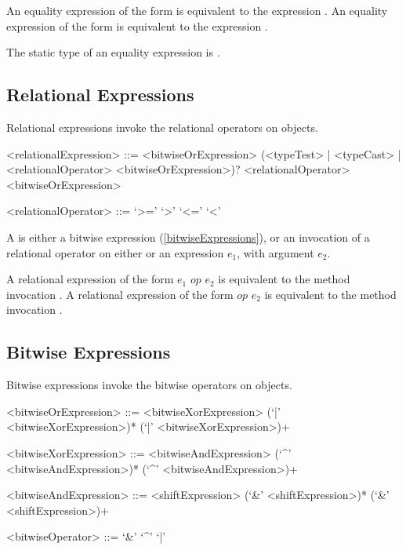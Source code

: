 \documentclass[makeidx]{article}
\begin{document}
\LMHash{}%
An equality expression of the form  is equivalent to the expression .
An equality expression of the form  is equivalent to the expression .


\LMHash{}%
The static type of an equality expression is .


\subsection{Relational Expressions}

\LMHash{}%
Relational expressions invoke the relational operators on objects.

\begin{grammar}
<relationalExpression> ::= <bitwiseOrExpression> \gnewline{}
  (<typeTest> | <typeCast> | <relationalOperator> <bitwiseOrExpression>)?
  \alt \SUPER{} <relationalOperator> <bitwiseOrExpression>

<relationalOperator> ::= `>='
  \alt `>'
  \alt `<='
  \alt `<'
\end{grammar}

\LMHash{}%
A  is either a bitwise expression (\ref{bitwiseExpressions}), or an invocation of a relational operator on either \SUPER{} or an expression $e_1$, with argument $e_2$.

\LMHash{}%
A relational expression of the form $e_1$ $op$ $e_2$ is equivalent to the method invocation .
A relational expression of the form \SUPER{} $op$ $e_2$ is equivalent to the method invocation .


\subsection{Bitwise Expressions}

\LMHash{}%
Bitwise expressions invoke the bitwise operators on objects.

\begin{grammar}
<bitwiseOrExpression> ::= \gnewline{}
  <bitwiseXorExpression> (`|' <bitwiseXorExpression>)*
  \alt \SUPER{} (`|' <bitwiseXorExpression>)+

<bitwiseXorExpression> ::= \gnewline{}
  <bitwiseAndExpression> (`^' <bitwiseAndExpression>)*
  \alt \SUPER{} (`^' <bitwiseAndExpression>)+

<bitwiseAndExpression> ::= <shiftExpression> (`\&' <shiftExpression>)*
  \alt \SUPER{} (`\&' <shiftExpression>)+

<bitwiseOperator> ::= `\&'
  \alt `^'
  \alt `|'
\end{grammar}
\end{document}
